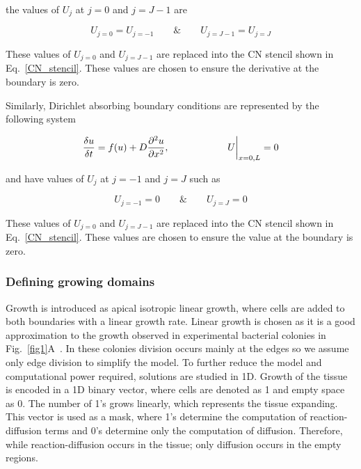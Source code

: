 the values of $U_{j}$ at $j=0$ and $j=J-1$ are

\begin{equation}
    U_{j=0} = U_{j=-1}  \quad \quad \&  \quad \quad  U_{j=J-1} = U_{j=J}
\end{equation}

These values of $U_{j=0}$ and $U_{j=J-1}$ are replaced into the CN stencil shown in Eq.~\ref{CN_stencil}.
These values are chosen to ensure the derivative at the boundary is zero.

Similarly, Dirichlet absorbing boundary conditions are represented by the following system

\begin{equation}
    \frac{\delta u}{\delta t} =  f(u) + D\frac{\partial^{2} {u}}{\partial {x}^{2}},   \quad \quad \quad \quad \quad \quad U\biggr\rvert_{x=0,L}=0
\end{equation}

and have values of $U_{j}$ at $j=-1$ and $j=J$ such as

\begin{equation}
    U_{j=-1} = 0  \quad \quad \&  \quad \quad  U_{j=J} = 0
\end{equation}

These values of $U_{j=0}$ and  $U_{j=J-1}$ are replaced into the CN stencil shown in Eq.~\ref{CN_stencil}.
These values are chosen to ensure the value at the boundary is zero.


\subsubsection*{Defining growing domains}
Growth is introduced as apical isotropic linear growth, where cells are added to both boundaries with a linear growth rate.
Linear growth is chosen as it is a good approximation to the growth observed in experimental bacterial colonies in Fig.~\ref{fig1}A~\parencite{Oliver2023}.
In these colonies division occurs mainly at the edges so we assume only edge division to simplify the model.
To further reduce the model and computational power required, solutions are studied in 1D.
Growth of the tissue is encoded in a 1D binary vector, where cells are denoted as 1 and empty space as 0.
The number of 1's grows linearly, which represents the tissue expanding.
This vector is used as a mask, where 1's determine the computation of reaction-diffusion terms and 0's determine only the computation of diffusion.
Therefore, while reaction-diffusion occurs in the tissue; only diffusion occurs in the empty regions.


